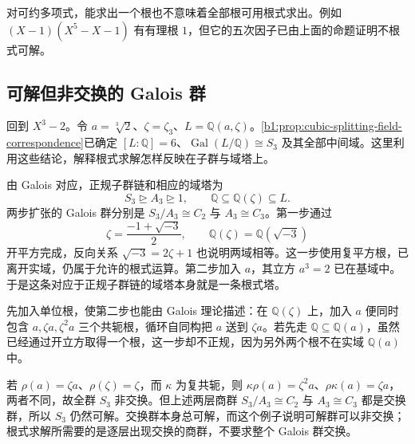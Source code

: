 \ProseParagraphBreak
对可约多项式，能求出一个根也不意味着全部根可用根式求出。例如 \((X-1)(X^5-X-1)\) 有有理根 \(1\)，但它的五次因子已由上面的命题证明不根式可解。

\subsection{可解但非交换的 Galois 群}
\label{b1:subsec:2103:03}

回到 \(X^3-2\)。令 \(a=\sqrt[3]{2}\)、\(\zeta=\zeta_3\)、\(L=\mathbb Q(a,\zeta)\)。\cref{b1:prop:cubic-splitting-field-correspondence}已确定 \([L:\mathbb Q]=6\)、\(\operatorname{Gal}(L/\mathbb Q)\cong S_3\) 及其全部中间域。这里利用这些结论，解释根式求解怎样反映在子群与域塔上。

\ProseParagraphBreak
由 Galois 对应，正规子群链和相应的域塔为
\[
	S_3\trianglerighteq A_3\trianglerighteq1, \qquad \mathbb Q\subseteq\mathbb Q(\zeta)\subseteq L.
\]
两步扩张的 Galois 群分别是 \(S_3/A_3\cong C_2\) 与 \(A_3\cong C_3\)。第一步通过
\[
	\zeta=\frac{-1+\sqrt{-3}}2, \qquad \mathbb Q(\zeta)=\mathbb Q(\sqrt{-3})
\]
开平方完成，反向关系 \(\sqrt{-3}=2\zeta+1\) 也说明两域相等。这一步使用复平方根，已离开实域，仍属于允许的根式运算。第二步加入 \(a\)，其立方 \(a^3=2\) 已在基域中。于是这条对应于正规子群链的域塔本身就是一条根式塔。

\ProseParagraphBreak
先加入单位根，使第二步也能由 Galois 理论描述：在 \(\mathbb Q(\zeta)\) 上，加入 \(a\) 便同时包含 \(a,\zeta a,\zeta^2a\) 三个共轭根，循环自同构把 \(a\) 送到 \(\zeta a\)。若先走 \(\mathbb Q\subseteq\mathbb Q(a)\)，虽然已经通过开立方取得一个根，这一步却不正规，因为另外两个根不在实域 \(\mathbb Q(a)\) 中。

\ProseParagraphBreak
若 \(\rho(a)=\zeta a\)、\(\rho(\zeta)=\zeta\)，而 \(\kappa\) 为复共轭，则 \(\kappa\rho(a)=\zeta^2a\)、\(\rho\kappa(a)=\zeta a\)，两者不同，故全群 \(S_3\) 非交换。但上述两层商群 \(S_3/A_3\cong C_2\) 与 \(A_3\cong C_3\) 都是交换群，所以 \(S_3\) 仍然可解。交换群本身总可解，而这个例子说明可解群可以非交换；根式求解所需要的是逐层出现交换的商群，不要求整个 Galois 群交换。

